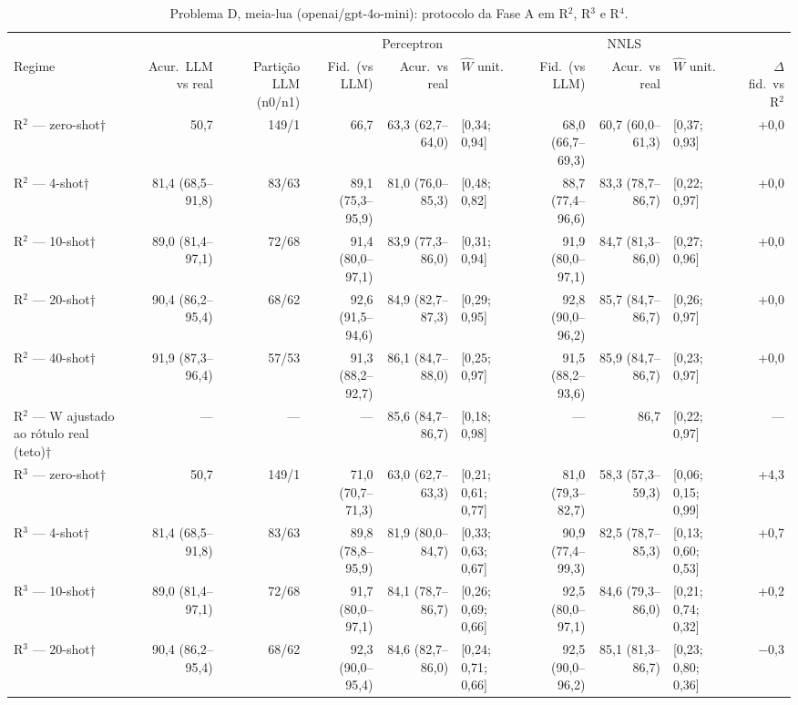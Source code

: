 \begin{table}[htbp]
\centering
\footnotesize
\caption{Problema D, meia-lua (openai/gpt-4o-mini): protocolo da Fase A em R$^2$, R$^3$ e R$^4$.}
\label{tab:T3_D_gpt4mini}
\begin{tabular}{lrrrrlrrlr}
\toprule
 &  &  & \multicolumn{3}{c}{Perceptron} & \multicolumn{3}{c}{NNLS} &  \\ \cmidrule(lr){4-6} \cmidrule(lr){7-9}
Regime & Acur.\ LLM vs real & Partição LLM (n0/n1) & Fid.\ (vs LLM) & Acur.\ vs real & $\hat{W}$ unit. & Fid.\ (vs LLM) & Acur.\ vs real & $\hat{W}$ unit. & $\Delta$ fid.\ vs R$^2$ \\
\midrule
R$^2$ — zero-shot† & 50,7 & 149/1 & 66,7 & 63,3 (62,7–64,0) & [0,34; 0,94] & 68,0 (66,7–69,3) & 60,7 (60,0–61,3) & [0,37; 0,93] & +0,0 \\
R$^2$ — 4-shot† & 81,4 (68,5–91,8) & 83/63 & 89,1 (75,3–95,9) & 81,0 (76,0–85,3) & [0,48; 0,82] & 88,7 (77,4–96,6) & 83,3 (78,7–86,7) & [0,22; 0,97] & +0,0 \\
R$^2$ — 10-shot† & 89,0 (81,4–97,1) & 72/68 & 91,4 (80,0–97,1) & 83,9 (77,3–86,0) & [0,31; 0,94] & 91,9 (80,0–97,1) & 84,7 (81,3–86,0) & [0,27; 0,96] & +0,0 \\
R$^2$ — 20-shot† & 90,4 (86,2–95,4) & 68/62 & 92,6 (91,5–94,6) & 84,9 (82,7–87,3) & [0,29; 0,95] & 92,8 (90,0–96,2) & 85,7 (84,7–86,7) & [0,26; 0,97] & +0,0 \\
R$^2$ — 40-shot† & 91,9 (87,3–96,4) & 57/53 & 91,3 (88,2–92,7) & 86,1 (84,7–88,0) & [0,25; 0,97] & 91,5 (88,2–93,6) & 85,9 (84,7–86,7) & [0,23; 0,97] & +0,0 \\
R$^2$ — W ajustado ao rótulo real (teto)† & — & — & — & 85,6 (84,7–86,7) & [0,18; 0,98] & — & 86,7 & [0,22; 0,97] & — \\
\midrule
R$^3$ — zero-shot† & 50,7 & 149/1 & 71,0 (70,7–71,3) & 63,0 (62,7–63,3) & [0,21; 0,61; 0,77] & 81,0 (79,3–82,7) & 58,3 (57,3–59,3) & [0,06; 0,15; 0,99] & +4,3 \\
R$^3$ — 4-shot† & 81,4 (68,5–91,8) & 83/63 & 89,8 (78,8–95,9) & 81,9 (80,0–84,7) & [0,33; 0,63; 0,67] & 90,9 (77,4–99,3) & 82,5 (78,7–85,3) & [0,13; 0,60; 0,53] & +0,7 \\
R$^3$ — 10-shot† & 89,0 (81,4–97,1) & 72/68 & 91,7 (80,0–97,1) & 84,1 (78,7–86,7) & [0,26; 0,69; 0,66] & 92,5 (80,0–97,1) & 84,6 (79,3–86,0) & [0,21; 0,74; 0,32] & +0,2 \\
R$^3$ — 20-shot† & 90,4 (86,2–95,4) & 68/62 & 92,3 (90,0–95,4) & 84,6 (82,7–86,0) & [0,24; 0,71; 0,66] & 92,5 (90,0–96,2) & 85,1 (81,3–86,7) & [0,23; 0,80; 0,36] & $-$0,3 \\

\end{tabular}
\end{table}
